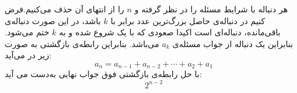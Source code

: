 \p
هر دنباله با شرایط مسئله را در نظر گرفته و
$n$
را از انتهای آن حذف می‌کنیم.فرض کنیم در دنباله‌ی حاصل بزرگ‌ترین عدد برابر با
$k$
باشد، در این صورت دنباله‌ی باقی‌مانده، دنباله‌ای است اکیدا صعودی که با یک شروع شده و به
$k$
ختم می‌شود. بنابراین یک دنباله از جواب مسئله‌ی
$a_k$
می‌باشد. بنابراین رابطه‌ی بازگشتی به صورت زیر در می‌آید:
$$a_n = a_{n-1} + a_{n-2} + \cdots + a_2 + a_1$$
با حل رابطه‌ی بازگشتی فوق جواب نهایی به‌دست می آید:
$$2^{n-2}$$